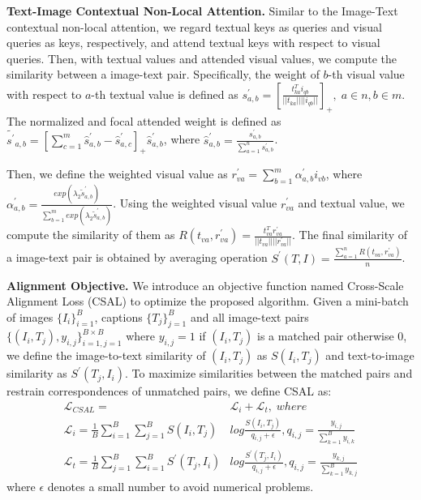 \documentclass[final]{cvpr}
\begin{document}
\textbf{Text-Image Contextual Non-Local Attention.} Similar to the Image-Text contextual non-local attention, we regard textual keys as queries and visual queries as keys, respectively, and attend textual keys with respect to visual queries. Then, with textual values and attended visual values, we compute the similarity between a image-text pair. Specifically, the weight of $b$-th visual value with respect to $a$-th textual value is defined as $s^{\prime}_{a,b}=[\frac{t^{T}_{ka}i_{qb}}{||t_{ka}||||i_{qb}||}]_{+},\;a\in n,b\in m$. The normalized and focal attended weight is defined as $\tilde{s^{\prime}}_{a,b}=[\sum_{c=1}^{m}\hat s^{\prime}_{a,b}-\hat s^{\prime}_{a,c}]_+\hat s^{\prime}_{a,b}$, where $\hat s^{\prime}_{a,b}=\frac{s^{\prime}_{a,b}}{\sum_{a=1}^{n}s^{\prime}_{a,b}}$.

Then, we define the weighted visual value as $r^{\prime}_{va}=\sum_{b=1}^{m}\alpha^{\prime}_{a,b} i_{vb}$, where $\alpha^{\prime}_{a,b}=\frac{exp(\lambda_2\tilde{s}^{\prime}_{a,b})}{\sum_{b=1}^{m}exp(\lambda_2\tilde{s}^{\prime}_{a,b})}$. Using the weighted visual value $r^{\prime}_{va}$ and textual value, we compute the similarity of them as $R(t_{va},r^{\prime}_{va})=\frac{t_{va}^{T}r^{\prime}_{va}}{||t_{va}||||r^{\prime}_{va}||}$. The final similarity of a image-text pair is obtained by averaging operation $S^{\prime}(T,I)=\frac{\sum_{a=1}^{n}R(t_{va},r^{\prime}_{va})}{n}$.

\textbf{Alignment Objective.} We introduce an objective function named Cross-Scale Alignment Loss (CSAL) to optimize the proposed algorithm. Given a mini-batch of images $\{I_i\}^{B}_{i=1}$, captions $\{T_j\}^{B}_{j=1}$ and all image-text pairs $\{(I_i,T_j),y_{i,j}\}^{B\times B}_{i=1,j=1}$ where $y_{i,j}=1$ if $(I_i,T_j)$ is a matched pair otherwise $0$, we define the image-to-text similarity of $(I_i,T_j)$ as $S(I_i,T_j)$ and text-to-image similarity as $S^{\prime}(T_j, I_i)$. To maximize similarities between the matched pairs and restrain correspondences of unmatched pairs, we define CSAL as:
\begin{align}\label{eq_loss}
    \mathcal{L}_{CSAL}=&\mathcal{L}_{i}+\mathcal{L}_{t},\;where\\\nonumber
    \mathcal{L}_{i}=\frac{1}{B}\sum^{B}_{i=1}\sum^{B}_{j=1}S(I_i,T_j)&log\frac{S(I_i,T_j)}{q_{i,j}+\epsilon},q_{i,j}=\frac{y_{i,j}}{\sum_{k=1}^{B}y_{i,k}} \\\nonumber
    \mathcal{L}_{t}=\frac{1}{B}\sum^{B}_{j=1}\sum^{B}_{i=1}S^{\prime}(T_j, I_i)&log\frac{S^{\prime}(T_j, I_i)}{q_{i,j}+\epsilon},q_{i,j}=\frac{y_{k,j}}{\sum_{k=1}^{B}y_{k,j}}
\end{align}
where $\epsilon$ denotes a small number to avoid numerical problems.
\end{document}
